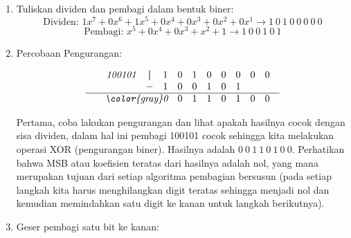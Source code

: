         \begin{enumerate}
            \item Tuliskan dividen dan pembagi dalam bentuk biner:
               \[ \text{Dividen: } 1x^7 + 0x^6 + 1x^5 + 0x^4 + 0x^3 + 0x^2 + 0x^1 \rightarrow 1 \ 0 \ 1 \ 0 \ 0 \ 0 \ 0 \ 0 \]
               \[ \text{Pembagi: } x^5 + 0x^4 + 0x^3 + x^2 + 1 \rightarrow 1 \ 0 \ 0 \ 1 \ 0 \ 1 \]
                       
            \item Percobaan Pengurangan:
            
                \[
                \begin{array}{r}\
                    \begin{array}{cccccccccc}
                        \textit{100101}& \textbf{|} & 1 & 0 & 1 & 0 & 0 & 0 & 0 & 0 \\
                        & - & 1 & 0 & 0 & 1 & 0 & 1 &   &   \\
                        \end{array} \\
                        \hline
                        \begin{array}{ccccccccc}
                          & \textit{\color{gray}0} & 0 & 1 & 1 & 0 & 1 & 0 & 0 \\
                    \end{array}
                \end{array}
                \]
                
                Pertama, coba lakukan pengurangan dan lihat apakah hasilnya cocok dengan sisa dividen, dalam hal ini pembagi 100101 cocok sehingga kita melakukan operasi XOR (pengurangan biner). Hasilnya adalah \( 0 \ 0 \ 1 \ 1 \ 0 \ 1 \ 0 \ 0 \). Perhatikan bahwa MSB atau koefisien teratas dari hasilnya adalah nol, yang mana merupakan tujuan dari setiap algoritma pembagian bersusun (pada setiap langkah kita harus menghilangkan digit teratas sehingga menjadi nol dan kemudian memindahkan satu digit ke kanan untuk langkah berikutnya).
        
            \item Geser pembagi satu bit ke kanan:
            

\end{enumerate}
